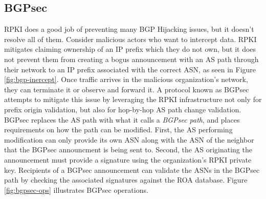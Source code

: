 \documentclass[conference]{IEEEtran}
\begin{document}
\subsection{BGPsec}
RPKI does a good job of preventing many BGP Hijacking issues, but it doesn't resolve all of them.  Consider malicious actors who want to intercept data.  RPKI mitigates claiming ownership of an IP prefix which they do not own, but it does not prevent them from creating a bogus announcement with an AS path through their network to an IP prefix associated with the correct ASN, as seen in Figure \ref{fig:bgp-inercept}.  Once traffic arrives in the malicious organization's network, they can terminate it or observe and forward it.  A protocol known as BGPsec attempts to mitigate this issue by leveraging the RPKI infrastructure not only for prefix origin validation, but also for hop-by-hop AS path change validation.  BGPsec replaces the AS path with what it calls a \emph{BGPsec path}, and places requirements on how the path can be modified.  First, the AS performing modification can only provide its own ASN along with the ASN of the neighbor that the BGPsec announcment is being sent to.  Second, the AS originating the announcement must provide a signature using the organization's RPKI private key.  Recipients of a BGPsec announcement can validate the ASNs in the BGPsec path by checking the associated signatures against the ROA database.  Figure \ref{fig:bgpsec-ops} illustrates BGPsec operations.
\end{document}
